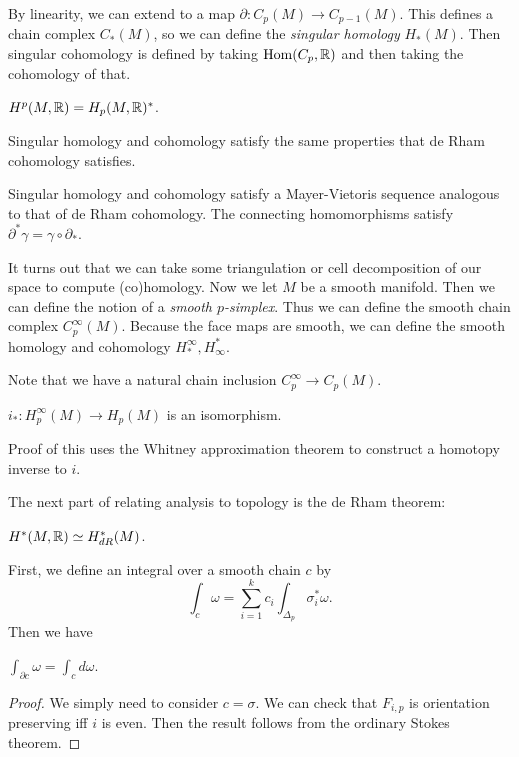 \documentclass[twoside, 10pt]{article}
\begin{document}
    By linearity, we can extend to a map $\partial: C_p(M) \to C_{p-1}(M)$.
    This defines a chain complex $C_*(M)$, so we can define the
    \textit{singular homology} $H_*(M)$. Then singular cohomology is defined by
    taking $\operatorname{Hom}(C_p, \mathbb{R})$ and then taking the cohomology of that.

    \begin{prop} $H^p(M, \mathbb{R}) = H_p(M, \mathbb{R})^*$.  \end{prop}

    \begin{prop} Singular homology and cohomology satisfy the same properties
    that de Rham cohomology satisfies.  \end{prop}

    \begin{thm} Singular homology and cohomology satisfy a Mayer-Vietoris
    sequence analogous to that of de Rham cohomology. The connecting
homomorphisms satisfy $\partial^* \gamma = \gamma \circ \partial_*$.  \end{thm}

    It turns out that we can take some triangulation or cell decomposition of
    our space to compute (co)homology. Now we let $M$ be a smooth manifold.
    Then we can define the notion of a \textit{smooth $p$-simplex}. Thus we can
    define the smooth chain complex $C_p^{\infty}(M)$. Because the face maps
    are smooth, we can define the smooth homology and cohomology $H_*^{\infty},
    H_{\infty}^*$.

    Note that we have a natural chain inclusion $C_p^{\infty} \to C_p(M)$.
    \begin{thm} $i_*: H_p^{\infty}(M) \to H_p(M)$ is an isomorphism.  \end{thm}
    Proof of this uses the Whitney approximation theorem to construct a
    homotopy inverse to $i$.
    
    The next part of relating analysis to topology is the de Rham theorem:
    \begin{thm}[de Rham] $H^*(M, \mathbb{R}) \simeq H^*_{dR}(M)$.  \end{thm}

    First, we define an integral over a smooth chain $c$ by \[ \int_c \omega =
        \sum_{i=1}^k c_i \int_{\Delta_p} \sigma_i^* \omega.\] Then we have
        \begin{thm}[Stokes] $\int_{ \partial c } \omega = \int_c d\omega$.
        \end{thm}

    \begin{proof} We simply need to consider $c = \sigma$. We can check that
    $F_{i,p}$ is orientation preserving iff $i$ is even. Then the result
follows from the ordinary Stokes theorem.  \end{proof}
\end{document}
